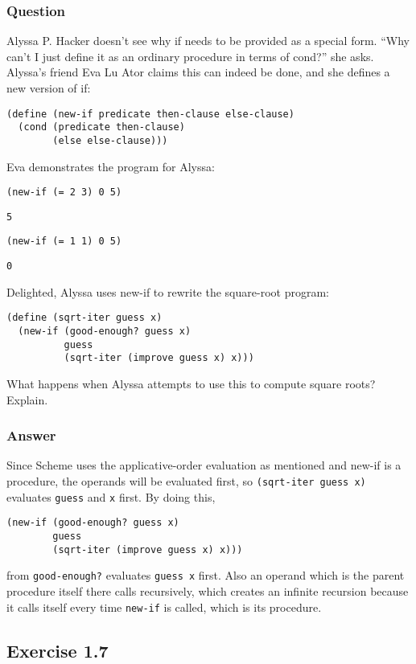 \documentclass[11pt]{article}
\begin{document}
\subsubsection{Question}
\label{sec:org1f5e5d8}
Alyssa P. Hacker doesn’t see why if needs to
be provided as a special form. “Why can’t I just define it as
an ordinary procedure in terms of cond?” she asks. Alyssa’s
friend Eva Lu Ator claims this can indeed be done, and she
defines a new version of if:
\begin{verbatim}
(define (new-if predicate then-clause else-clause)
  (cond (predicate then-clause)
        (else else-clause)))
\end{verbatim}
Eva demonstrates the program for Alyssa:
\begin{verbatim}
(new-if (= 2 3) 0 5)
\end{verbatim}
\begin{verbatim}
5
\end{verbatim}
\begin{verbatim}
(new-if (= 1 1) 0 5)
\end{verbatim}
\begin{verbatim}
0
\end{verbatim}
Delighted, Alyssa uses new-if to rewrite the square-root
program:
\begin{verbatim}
(define (sqrt-iter guess x)
  (new-if (good-enough? guess x)
          guess
          (sqrt-iter (improve guess x) x)))
\end{verbatim}
What happens when Alyssa attempts to use this to compute
square roots? Explain.

\subsubsection{Answer}
\label{sec:org999a5b0}
Since Scheme uses the applicative-order evaluation as mentioned and new-if is a procedure,
the operands will be evaluated first, so \texttt{(sqrt-iter guess x)} evaluates \texttt{guess} and \texttt{x} first.
By doing this,
\begin{verbatim}
(new-if (good-enough? guess x)
        guess
        (sqrt-iter (improve guess x) x)))
\end{verbatim}
from \texttt{good-enough?} evaluates \texttt{guess x} first. Also an operand which is the parent procedure itself there
calls recursively, which creates an infinite recursion because it calls itself every time \texttt{new-if} is called,
which is its procedure.

\subsection{Exercise 1.7}
\label{sec:org0cd07b2}
\end{document}
